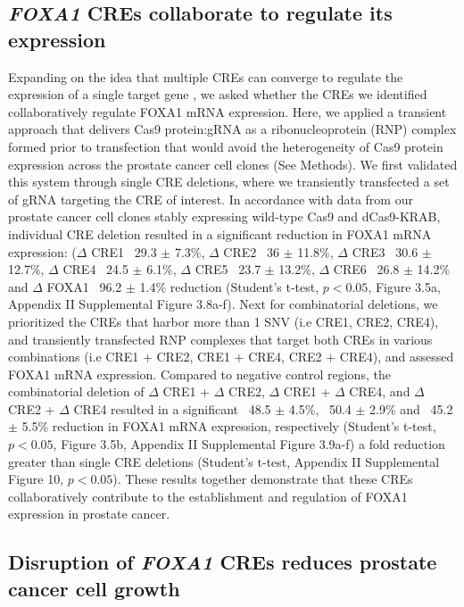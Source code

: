 \subsection{\emph{FOXA1} CREs collaborate to regulate its expression}

Expanding on the idea that multiple CREs can converge to regulate the expression of a single target gene \cite{sallariConvergenceDispersedRegulatory2016,baileyNoncodingSomaticInherited2016,pennacchioEnhancersFiveEssential2013}, we asked whether the CREs we identified collaboratively regulate FOXA1 mRNA expression.
Here, we applied a transient approach that delivers Cas9 protein:gRNA as a ribonucleoprotein (RNP) complex formed prior to transfection that would avoid the heterogeneity of Cas9 protein expression across the prostate cancer cell clones (See Methods).
We first validated this system through single CRE deletions, where we transiently transfected a set of gRNA targeting the CRE of interest.
In accordance with data from our prostate cancer cell clones stably expressing wild-type Cas9 and dCas9-KRAB, individual CRE deletion resulted in a significant reduction in FOXA1 mRNA expression: ($\Delta$ CRE1 ~29.3 $\pm$ 7.3\%, $\Delta$ CRE2 ~36 $\pm$ 11.8\%, $\Delta$ CRE3 ~30.6 $\pm$ 12.7\%, $\Delta$ CRE4 ~24.5 $\pm$ 6.1\%, $\Delta$ CRE5 ~23.7 $\pm$ 13.2\%, $\Delta$ CRE6 ~26.8 $\pm$ 14.2\% and $\Delta$ FOXA1 ~96.2 $\pm$ 1.4\% reduction (Student’s t-test, $p<0.05$, Figure 3.5a, Appendix II Supplemental Figure 3.8a-f).
Next for combinatorial deletions, we prioritized the CREs that harbor more than 1 SNV (i.e CRE1, CRE2, CRE4), and transiently transfected RNP complexes that target both CREs in various combinations (i.e CRE1 + CRE2, CRE1 + CRE4, CRE2 + CRE4), and assessed FOXA1 mRNA expression.
Compared to negative control regions, the combinatorial deletion of $\Delta$ CRE1 + $\Delta$ CRE2, $\Delta$ CRE1 + $\Delta$ CRE4, and $\Delta$ CRE2 + $\Delta$ CRE4 resulted in a significant ~48.5 $\pm$ 4.5\%, ~50.4 $\pm$ 2.9\% and ~45.2 $\pm$ 5.5\% reduction in FOXA1 mRNA expression, respectively (Student’s t-test, $p<0.05$, Figure 3.5b, Appendix II Supplemental Figure 3.9a-f) a fold reduction greater than single CRE deletions (Student’s t-test, Appendix II Supplemental Figure 10, $p<0.05$).
These results together demonstrate that these CREs collaboratively contribute to the establishment and regulation of FOXA1 expression in prostate cancer.

\subsection{Disruption of \emph{FOXA1} CREs reduces prostate cancer cell growth}

